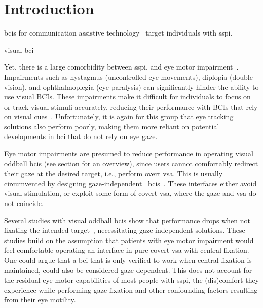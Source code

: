 \section{Introduction}


\Acp{bci} for communication assistive technology~\cite{Millan2010}
target individuals with \ac{sspi}.

visual bci

Yet, there is a large comorbidity between \ac{sspi}, and eye motor impairment~\cite{FriedOken2020}.
Impairments such as nystagmus (uncontrolled eye movements), diplopia (double
vision), and ophthalmoplegia (eye paralysis) can significantly hinder
the ability to use visual BCIs. These impairments make it difficult for
individuals to focus on or track visual stimuli accurately, reducing their
performance with BCIs that rely on visual cues~\cite{McCane2014,FriedOken2020,Pasqualotto2015}.
Unfortunately, it is again for this group that eye tracking solutions also
perform poorly, making them more reliant on potential developments in \ac{bci}
that do not rely on eye gaze.

Eye motor impairments are presumed to reduce performance in operating visual
oddball \ac{bci}s (see section for an overview), since users
cannot comfortably redirect their gaze at the desired target,
i.e., perform overt \ac{vsa}.
This is usually circumvented by designing gaze-independent~
\acp{bci}~\cite{Riccio2012}.
These interfaces either avoid visual stimulation, or exploit some form of
covert \ac{vsa}, where the gaze and \ac{vsa} do not coincide.

Several studies with visual oddball \acp{bci} show that performance drops when not fixating the intended
target~\cite{Brunner2010, Treder2010, RonAngevin2019}, necessitating
gaze-independent solutions.
These studies build on the assumption that patients with eye motor impairment
would feel comfortable operating an interface in pure covert \ac{vsa} with
central fixation.
One could argue that a \ac{bci} that is only verified to work when central
fixation is maintained, could also be considered gaze-dependent.
This does not account for the residual eye motor capabilities of most people
with \ac{sspi}, the (dis)comfort they experience while
performing gaze fixation and other confounding factors resulting from their eye
motility.

